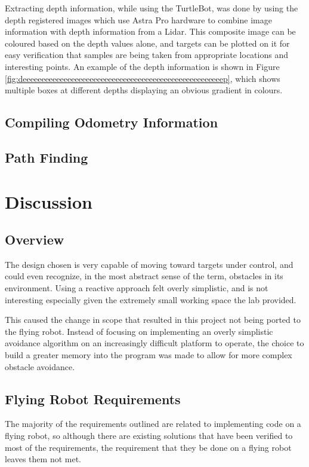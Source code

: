 \documentclass{article}[12]
\begin{document}
Extracting depth information, while using the TurtleBot, was done by using the depth registered images which use Astra Pro hardware to combine image information with depth information from a Lidar. This composite image can be coloured based on the depth values alone, and targets can be plotted on it for easy verification that samples are being taken from appropriate locations and interesting points. An example of the depth information is shown in Figure \ref{fig:deeeeeeeeeeeeeeeeeeeeeeeeeeeeeeeeeeeeeeeeeeeeeeeeeeeeeep}, which shows multiple boxes at different depths displaying an obvious gradient in colours.

\subsection{Compiling Odometry Information}

\subsection{Path Finding}


\section{Discussion}

\subsection{Overview}

	The design chosen is very capable of moving toward targets under control, and could even recognize, in the most abstract sense of the term, obstacles in its environment. Using a reactive approach felt overly simplistic, and is not interesting especially given the extremely small working space the lab provided.
	
	This caused the change in scope that resulted in this project not being ported to the flying robot. Instead of focusing on implementing an overly simplistic avoidance algorithm on an increasingly difficult platform to operate, the choice to build a greater memory into the program was made to allow for more complex obstacle avoidance.
	
	
\subsection{Flying Robot Requirements}

The majority of the requirements outlined are related to implementing code on a flying robot, so although there are existing solutions that have been verified to most of the requirements, the requirement that they be done on a flying robot leaves them not met.
\end{document}
